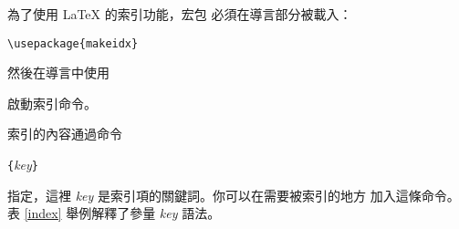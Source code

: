 為了使用 \LaTeX{} 的索引功能，宏包  必須在導言部分被載入：
\begin{lscommand}
  \verb|\usepackage{makeidx}|
\end{lscommand}
\noindent 然後在導言中使用
\begin{lscommand}
\end{lscommand}
\noindent 啟動索引命令。


索引的內容通過命令
\begin{lscommand}
  \verb|{|\emph{key}\verb|}|
\end{lscommand}
\noindent
指定，這裡 \emph{key} 是索引項的關鍵詞。你可以在需要被索引的地方
加入這條命令。表 \ref{index} 舉例解釋了參量 \emph{key} 語法。


